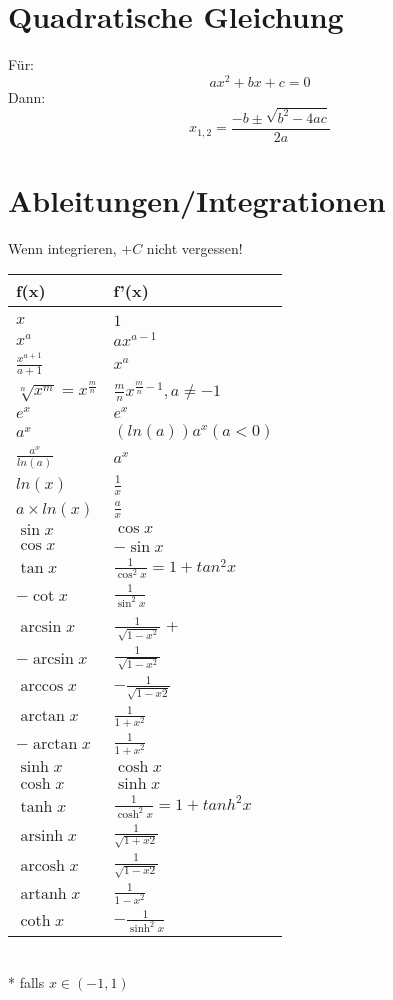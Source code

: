 \documentclass[../main.tex]{subfiles}
\begin{document}
\section{Quadratische Gleichung}
Für:
\[ax^2+bx+c=0\]
Dann:
\[x_{1,2}=\frac{-b\pm\sqrt{b^2-4ac}}{2a}\]

\section{Ableitungen/Integrationen}
Wenn integrieren, $+C$ nicht vergessen! \\ [7pt]
\begin{tabularx}{0.8\textwidth} { 
    >{\centering\arraybackslash}X 
    >{\centering\arraybackslash}X  }
    \hline
    f(x) & f'(x) \\ [7pt]
    \hline \\
    $x$ & $1$
    \\ [7pt]
    $x^a$ & $ax^{a-1}$
    \\ [7pt]
    $\frac{x^{a+1}}{a+1}$ & $x^a$
    \\ [7pt]
    $\sqrt[n]{x^m} = x^{\frac{m}{n}}$ & $\frac{m}{n}x^{\frac{m}{n}-1}, a \neq -1$
    \\ [7pt]
    $e^x$ & $e^x$
    \\ [7pt]
    $a^x$ & $(ln(a))a^x (a<0)$
    \\ [7pt]
    $\frac{a^x}{ln(a)}$ & $a^x$
    \\ [7pt]
    $ln(x)$ & $\frac{1}{x}$ 
    \\ [7pt]
    $a \times ln(x)$ & $\frac{a}{x}$
    \\ [7pt]
    $\sin x$ & $\cos x$
    \\ [7pt]
    $\cos x$ & $-\sin x$
    \\ [7pt]
    $\tan x$ & $\frac{1}{\cos ^2x} = 1 + tan ^2 x$
    \\ [7pt]
    $-\cot x$ & $\frac{1}{\sin ^2x}$
    \\ [7pt]
    $\arcsin x$ & $\frac{1}{\sqrt[]{1-x^2}}$ +
    \\ [7pt]
    $-\arcsin x$ & $\frac{1}{\sqrt[]{1-x^2}}$
    \\ [7pt]
    $\arccos x$ & $-\frac{1}{\sqrt{1 - x2}}$
    \\ [7pt]
    $\arctan x$ & $\frac{1}{1 + x^2}$ 
    \\ [7pt]
    $-\arctan x$ & $\frac{1}{1 + x^2}$ 
    \\ [7pt]
    $\sinh x$ & $\cosh x$
    \\ [7pt]
    $\cosh x$ & $\sinh x$
    \\ [7pt]
    $\tanh x$ & $\frac{1}{\cosh ^2x} = 1 + tanh ^2 x$
    \\ [7pt]
    $\operatorname{arsinh} x$ & $\frac{1}{\sqrt{1 + x2}}$
    \\ [7pt]
    $\operatorname{arcosh} x$ & $\frac{1}{\sqrt{1 - x2}}$
    \\ [7pt]
    $\operatorname{artanh} x$ & $\frac{1}{1 - x^2}$ 
    \\ [7pt]
    $\coth x$ & $-\frac{1}{\sinh^2x}$
\end{tabularx} \\ [7pt]
* falls $x \in (-1,1)$
\end{document}
